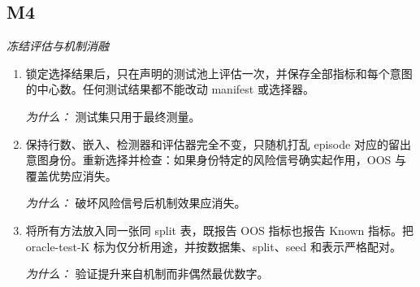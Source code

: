 \documentclass[10pt,a4paper]{article}
\begin{document}
\subsection*{M4}
\emph{冻结评估与机制消融}
\begin{enumerate}[leftmargin=*,start=7]
  \item 锁定选择结果后，只在声明的测试池上评估一次，并保存全部指标和每个意图的中心数。任何测试结果都不能改动 manifest 或选择器。
\par\emph{为什么：} 测试集只用于最终测量。
  \item 保持行数、嵌入、检测器和评估器完全不变，只随机打乱 episode 对应的留出意图身份。重新选择并检查：如果身份特定的风险信号确实起作用，OOS 与覆盖优势应消失。
\par\emph{为什么：} 破坏风险信号后机制效果应消失。
  \item 将所有方法放入同一张同 split 表，既报告 OOS 指标也报告 Known 指标。把 oracle-test-K 标为仅分析用途，并按数据集、split、seed 和表示严格配对。
\par\emph{为什么：} 验证提升来自机制而非偶然最优数字。
\end{enumerate}
\end{document}
